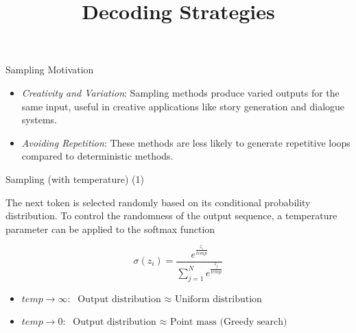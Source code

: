 



\newcommand{\learninggoals}{
\item Get to know different stochastic decoding strategies
\item Learn about sampling with temperature, top-k sampling and top-p (nucleus) sampling
\item learn about contrastive search and contrastive decoding
}
\def\myblue#1{\textcolor{texblue}{#1}}

\title{Decoding Strategies}
\date{}




\begin{vbframe}{Sampling Motivation}

\vfill
    
\begin{itemize}
    \item \textit{Creativity and Variation}: Sampling methods produce varied outputs for the same input, useful in creative applications like story generation and dialogue systems.
    \item \textit{Avoiding Repetition}: These methods are less likely to generate repetitive loops compared to deterministic methods.
\end{itemize}

\vfill

\end{vbframe}


\begin{vbframe}{Sampling (with temperature) (1)}



The next token is selected randomly based on its conditional probability distribution. To control the randomness of the output sequence, a temperature parameter can be applied to the softmax function

\vfill 

$$
\sigma\left(z_i\right)=\frac{e^{\frac{z_i}{temp}}}{\sum_{j=1}^N e^{\frac{z_j}{temp}}}
$$

\vfill

\begin{itemize}
\item $temp \rightarrow \infty: \text{ Output distribution $\approx$ Uniform distribution}$
\item $temp \rightarrow 0: \text{ Output distribution $\approx$ Point mass (Greedy search) }$
\end{itemize}



\end{vbframe}


